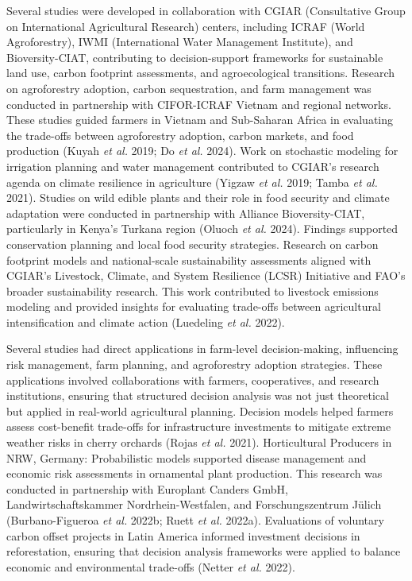 \documentclass[
]{article}
\begin{document}
Several studies were developed in collaboration with CGIAR (Consultative
Group on International Agricultural Research) centers, including ICRAF
(World Agroforestry), IWMI (International Water Management Institute),
and Bioversity-CIAT, contributing to decision-support frameworks for
sustainable land use, carbon footprint assessments, and agroecological
transitions. Research on agroforestry adoption, carbon sequestration,
and farm management was conducted in partnership with CIFOR-ICRAF
Vietnam and regional networks. These studies guided farmers in Vietnam
and Sub-Saharan Africa in evaluating the trade-offs between agroforestry
adoption, carbon markets, and food production (Kuyah \emph{et al.} 2019;
Do \emph{et al.} 2024). Work on stochastic modeling for irrigation
planning and water management contributed to CGIAR's research agenda on
climate resilience in agriculture (Yigzaw \emph{et al.} 2019; Tamba
\emph{et al.} 2021). Studies on wild edible plants and their role in
food security and climate adaptation were conducted in partnership with
Alliance Bioversity-CIAT, particularly in Kenya's Turkana region (Oluoch
\emph{et al.} 2024). Findings supported conservation planning and local
food security strategies. Research on carbon footprint models and
national-scale sustainability assessments aligned with CGIAR's
Livestock, Climate, and System Resilience (LCSR) Initiative and FAO's
broader sustainability research. This work contributed to livestock
emissions modeling and provided insights for evaluating trade-offs
between agricultural intensification and climate action (Luedeling
\emph{et al.} 2022).

Several studies had direct applications in farm-level decision-making,
influencing risk management, farm planning, and agroforestry adoption
strategies. These applications involved collaborations with farmers,
cooperatives, and research institutions, ensuring that structured
decision analysis was not just theoretical but applied in real-world
agricultural planning. Decision models helped farmers assess
cost-benefit trade-offs for infrastructure investments to mitigate
extreme weather risks in cherry orchards (Rojas \emph{et al.} 2021).
Horticultural Producers in NRW, Germany: Probabilistic models supported
disease management and economic risk assessments in ornamental plant
production. This research was conducted in partnership with Europlant
Canders GmbH, Landwirtschaftskammer Nordrhein-Westfalen, and
Forschungszentrum Jülich (Burbano-Figueroa \emph{et al.} 2022b; Ruett
\emph{et al.} 2022a). Evaluations of voluntary carbon offset projects in
Latin America informed investment decisions in reforestation, ensuring
that decision analysis frameworks were applied to balance economic and
environmental trade-offs (Netter \emph{et al.} 2022).
\end{document}
